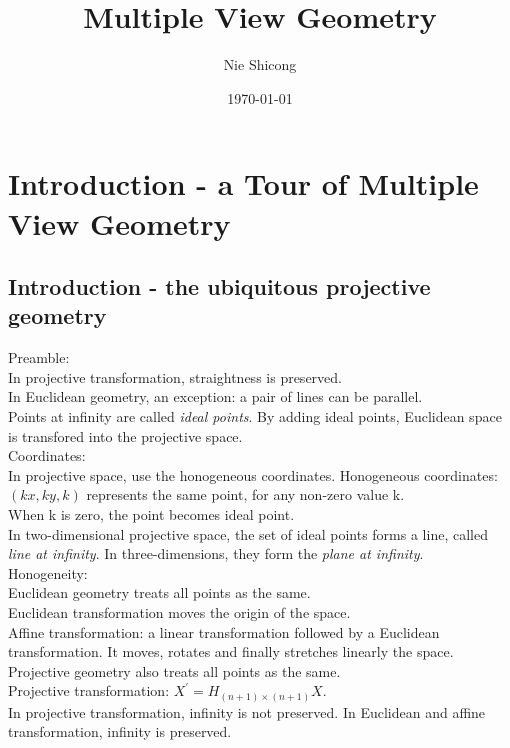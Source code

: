 \documentclass[12pt]{article}
\title{Multiple View Geometry}
\author{Nie Shicong}
\date{\today}
\begin{document}
\begin{titlepage}
\maketitle
\tableofcontents
\end{titlepage}

\section{Introduction - a Tour of Multiple View Geometry}
\subsection{Introduction - the ubiquitous projective geometry}
Preamble: \\
In projective transformation, straightness is preserved. \\
In Euclidean geometry, an exception: a pair of lines can be parallel. \\
Points at infinity are called \textit{ideal points}. By adding ideal points, 
Euclidean space is transfored into the projective space. \\

\noindent Coordinates: \\
In projective space, use the honogeneous coordinates.
Honogeneous coordinates: $(kx, ky, k)$ represents the same point, for any
non-zero value k. \\
When k is zero, the point becomes ideal point. \\
In two-dimensional projective space, the set of ideal points forms a line, called \textit{line at infinity}.
In three-dimensions, they form the \textit{plane at infinity}. \\

\noindent Honogeneity: \\
Euclidean geometry treats all points as the same. \\
Euclidean transformation moves the origin of the space. \\
Affine transformation: a linear transformation followed by a Euclidean transformation.
It moves, rotates and finally stretches linearly the space. \\
Projective geometry also treats all points as the same. \\
Projective transformation: $ X^\prime = H_{(n+1) \times (n+1)}X $. \\
In projective transformation, infinity is not preserved. In Euclidean and affine transformation, 
infinity is preserved.
\end{document}
